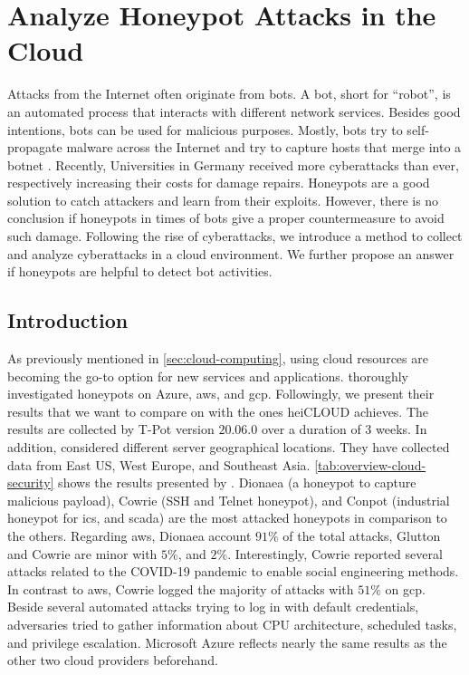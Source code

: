 \chapter{Analyze Honeypot Attacks in the Cloud}
\label{chap:cloud-security}

Attacks from the Internet often originate from bots.
A bot, short for \enquote{robot}, is an automated process that interacts with different network services.
Besides good intentions, bots can be used for malicious purposes.
Mostly, bots try to self-propagate malware across the Internet and try to capture hosts that merge into a botnet \cite{Feily2009}.
Recently, Universities in Germany received more cyberattacks than ever, respectively increasing their costs for damage repairs.
Honeypots are a good solution to catch attackers and learn from their exploits.
However, there is no conclusion if honeypots in times of bots give a proper countermeasure to avoid such damage.
Following the rise of cyberattacks, we introduce a method to collect and analyze cyberattacks in a cloud environment.
We further propose an answer if honeypots are helpful to detect bot activities.

\section{Introduction}

As previously mentioned in \autoref{sec:cloud-computing}, using cloud resources are becoming the go-to option for new services and applications.
\citet{Kelly2021} thoroughly investigated honeypots on Azure, \ac{aws}, and \ac{gcp}.
Followingly, we present their results that we want to compare on with the ones heiCLOUD achieves.
The results are collected by T-Pot version $20.06.0$ over a duration of 3 weeks.
In addition, \citet{Kelly2021} considered different server geographical locations.
They have collected data from East US, West Europe, and Southeast Asia.
\autoref{tab:overview-cloud-security} shows the results presented by \citet{Kelly2021}.
Dionaea (a honeypot to capture malicious payload), Cowrie (SSH and Telnet honeypot), and Conpot (industrial honeypot for \acs{ics}, and \acs{scada}) are the most attacked honeypots in comparison to the others.
Regarding \ac{aws}, Dionaea account $91\%$ of the total attacks, Glutton and Cowrie are minor with $5\%$, and $2\%$.
Interestingly, Cowrie reported several attacks related to the COVID-19 pandemic to enable social engineering methods.
In contrast to \ac{aws}, Cowrie logged the majority of attacks with $51\%$ on \ac{gcp}.
Beside several automated attacks trying to log in with default credentials, adversaries tried to gather information about CPU architecture, scheduled tasks, and privilege escalation.
Microsoft Azure reflects nearly the same results as the other two cloud providers beforehand.

